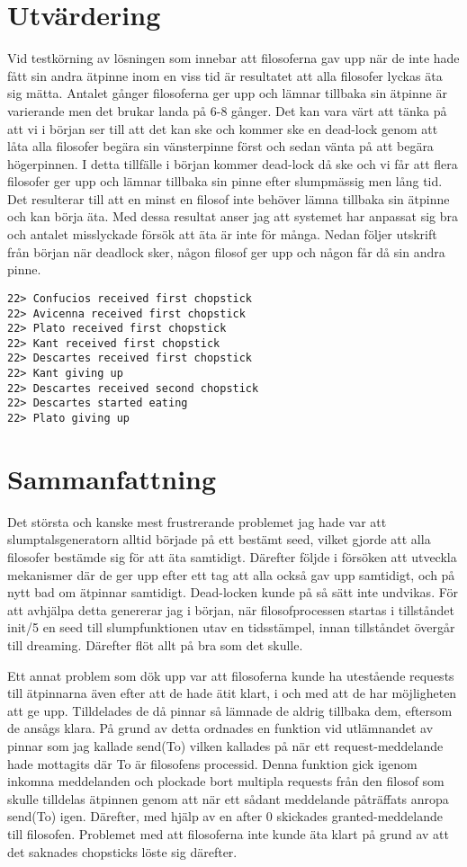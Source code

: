 \documentclass[a4paper, 11pt]{article}
\begin{document}
\section{Utvärdering}

Vid testkörning av lösningen som innebar att filosoferna gav upp när de inte hade fått sin andra ätpinne inom en viss tid är resultatet att alla filosofer lyckas äta sig mätta. Antalet gånger filosoferna ger upp och lämnar tillbaka sin ätpinne är varierande men det brukar landa på 6-8 gånger. Det kan vara värt att tänka på att vi i början ser till att det kan ske och kommer ske en dead-lock genom att låta alla filosofer begära sin vänsterpinne först och sedan vänta på att begära högerpinnen. I detta tillfälle i början kommer dead-lock då ske och vi får att flera filosofer ger upp och lämnar tillbaka sin pinne efter slumpmässig men lång tid. Det resulterar till att en minst en filosof inte behöver lämna tillbaka sin ätpinne och kan börja äta. Med dessa resultat anser jag att systemet har anpassat sig bra och antalet misslyckade försök att äta är inte för många. Nedan följer utskrift från början när deadlock sker, någon filosof ger upp och någon får då sin andra pinne.
\begin{verbatim}
22> Confucios received first chopstick
22> Avicenna received first chopstick
22> Plato received first chopstick
22> Kant received first chopstick
22> Descartes received first chopstick
22> Kant giving up
22> Descartes received second chopstick
22> Descartes started eating
22> Plato giving up
\end{verbatim}

\section{Sammanfattning}

Det största och kanske mest frustrerande problemet jag hade var att slumptalsgeneratorn alltid började på ett bestämt seed, vilket gjorde att alla filosofer bestämde sig för att äta samtidigt. Därefter följde i försöken att utveckla mekanismer där de ger upp efter ett tag att alla också gav upp samtidigt, och på nytt bad om ätpinnar samtidigt. Dead-locken kunde på så sätt inte undvikas. För att avhjälpa detta genererar jag i början, när filosofprocessen startas i tillståndet init/5 en seed till slumpfunktionen utav en tidsstämpel, innan tillståndet övergår till dreaming. Därefter flöt allt på bra som det skulle.

Ett annat problem som dök upp var att filosoferna kunde ha utestående requests till ätpinnarna även efter att de hade ätit klart, i och med att de har möjligheten att ge upp. Tilldelades de då pinnar så lämnade de aldrig tillbaka dem, eftersom de ansågs klara. På grund av detta ordnades en funktion vid utlämnandet av pinnar som jag kallade send(To) vilken kallades på när ett request-meddelande hade mottagits där To är filosofens processid. Denna funktion gick igenom inkomna meddelanden och plockade bort multipla requests från den filosof som skulle tilldelas ätpinnen genom att när ett sådant meddelande påträffats anropa send(To) igen. Därefter, med hjälp av en after 0 skickades granted-meddelande till filosofen. Problemet med att filosoferna inte kunde äta klart på grund av att det saknades chopsticks löste sig därefter.
\end{document}
